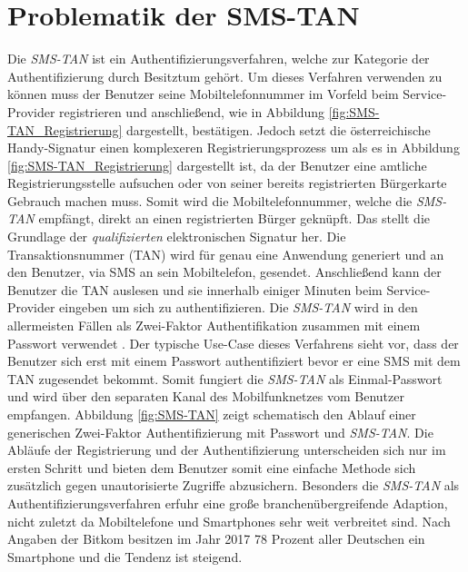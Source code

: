 \documentclass[11pt,a4paper,ngerman]{scrreprt}
\begin{document}
\section{Problematik der SMS-TAN}\label{sec:smstan-problematik}
Die \textit{SMS-TAN} ist ein Authentifizierungsverfahren, welche zur Kategorie der Authentifizierung durch Besitztum gehört. Um dieses Verfahren verwenden zu können muss der Benutzer seine Mobiltelefonnummer im Vorfeld beim Service-Provider registrieren und anschließend, wie in Abbildung \ref{fig:SMS-TAN_Registrierung} dargestellt, bestätigen. Jedoch setzt die österreichische Handy-Signatur einen komplexeren Registrierungsprozess um als es in Abbildung \ref{fig:SMS-TAN_Registrierung} dargestellt ist, da der Benutzer eine amtliche Registrierungsstelle aufsuchen oder von seiner bereits registrierten Bürgerkarte Gebrauch machen muss. Somit wird die Mobiltelefonnummer, welche die \textit{SMS-TAN} empfängt, direkt an einen registrierten Bürger geknüpft. Das stellt die Grundlage der \emph{qualifizierten} elektronischen Signatur her. Die Transaktionsnummer (TAN) wird für genau eine Anwendung generiert und an den Benutzer, via SMS an sein Mobiltelefon, gesendet. Anschließend kann der Benutzer die TAN auslesen und sie innerhalb einiger Minuten beim Service-Provider eingeben um sich zu authentifizieren. Die \textit{SMS-TAN} wird in den allermeisten Fällen als Zwei-Faktor Authentifikation zusammen mit einem Passwort verwendet \cite{fido17}. Der typische Use-Case dieses Verfahrens sieht vor, dass der Benutzer sich erst mit einem Passwort authentifiziert bevor er eine SMS mit dem TAN zugesendet bekommt. Somit fungiert die \textit{SMS-TAN} als Einmal-Passwort und wird über den separaten Kanal des Mobilfunknetzes vom Benutzer empfangen. Abbildung \ref{fig:SMS-TAN} zeigt schematisch den Ablauf einer generischen Zwei-Faktor Authentifizierung mit Passwort und \textit{SMS-TAN}. Die Abläufe der Registrierung und der Authentifizierung unterscheiden sich nur im ersten Schritt und bieten dem Benutzer somit eine einfache Methode sich zusätzlich gegen unautorisierte Zugriffe abzusichern. Besonders die \textit{SMS-TAN} als Authentifizierungsverfahren erfuhr eine große branchenübergreifende Adaption, nicht zuletzt da Mobiltelefone und Smartphones sehr weit verbreitet sind. Nach Angaben der Bitkom besitzen im Jahr 2017 78 Prozent aller Deutschen ein Smartphone \cite{bitkomMob} und die Tendenz ist steigend.
\end{document}
